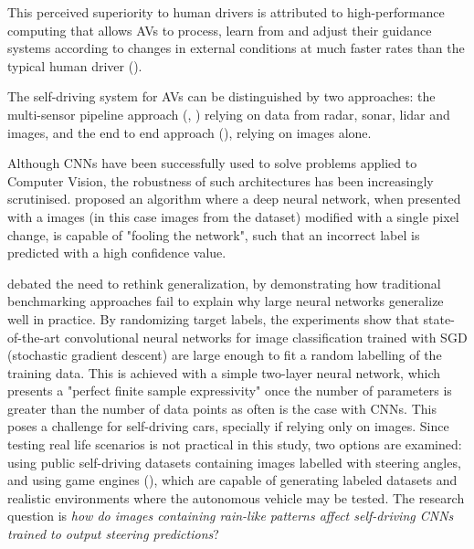 This perceived superiority to human drivers is attributed to high-performance computing that allows AVs to process, learn from and adjust their guidance systems according
to changes in external conditions at much faster rates than the typical human driver  (\cite{west2016moving}).


The self-driving system for AVs can be distinguished by two approaches: the multi-sensor pipeline approach (\cite{Grigorescu_2020}, \cite{Yurtsever_2020}) relying on data from radar, sonar, lidar and images,
and the end to end approach (\cite{bojarski2016end}), relying on images alone. 

Although CNNs have been successfully used to solve problems applied to Computer Vision, the robustness of such architectures has been increasingly scrutinised. \cite{Su_2019} proposed an algorithm where a deep neural network, when presented with a images (in this case images from the \cite{CIFAR_10} dataset) modified with a single pixel change, is capable of "fooling the network", such that an incorrect label is predicted with a high confidence value.  


\cite{zhang2017understanding} debated the need to rethink generalization, by demonstrating how traditional benchmarking approaches fail to explain why large neural networks generalize well in practice. By randomizing target labels, the experiments show that state-of-the-art convolutional neural networks for image classification trained with SGD (stochastic gradient descent) are large enough to fit a random labelling of the training data. This is achieved with a simple two-layer neural network, which presents a "perfect finite sample expressivity" once the number of parameters is greater than the number of data points as often is the case with CNNs.  
This poses a challenge for self-driving cars, specially if relying only on images. Since testing real life scenarios is not practical in this study, two options are examined: using public self-driving datasets containing images labelled with steering angles, and using game engines (\cite{cowan2014survey}), which are capable of generating labeled datasets and realistic environments where the autonomous vehicle may be tested.
The research question is \textit{how do images containing rain-like patterns affect self-driving CNNs trained to output steering predictions}? 

